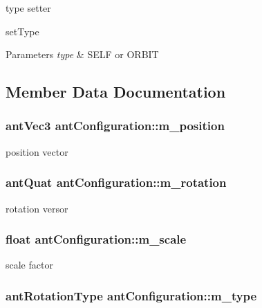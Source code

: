 type setter 

set\+Type 
\begin{DoxyParams}{Parameters}
{\em type} & S\+E\+L\+F or O\+R\+B\+I\+T \\
\hline
\end{DoxyParams}


\subsection{Member Data Documentation}
\hypertarget{classant_configuration_ab9fd2e843700f3589988064a9a2b494d}{
\subsubsection[{m\+\_\+position}]{\setlength{\rightskip}{0pt plus 5cm}ant\+Vec3 ant\+Configuration\+::m\+\_\+position\hspace{0.3cm}{\ttfamily [private]}}}\label{classant_configuration_ab9fd2e843700f3589988064a9a2b494d}
position vector \hypertarget{classant_configuration_a2cd9ee51364f0481040a6c9c1faf42ac}{
\subsubsection[{m\+\_\+rotation}]{\setlength{\rightskip}{0pt plus 5cm}ant\+Quat ant\+Configuration\+::m\+\_\+rotation\hspace{0.3cm}{\ttfamily [private]}}}\label{classant_configuration_a2cd9ee51364f0481040a6c9c1faf42ac}
rotation versor \hypertarget{classant_configuration_ae1addd09ae683a014f37492aab019926}{
\subsubsection[{m\+\_\+scale}]{\setlength{\rightskip}{0pt plus 5cm}float ant\+Configuration\+::m\+\_\+scale\hspace{0.3cm}{\ttfamily [private]}}}\label{classant_configuration_ae1addd09ae683a014f37492aab019926}
scale factor \hypertarget{classant_configuration_a9c6602c2995ea38583650da13b36b015}{
\subsubsection[{m\+\_\+type}]{\setlength{\rightskip}{0pt plus 5cm}ant\+Rotation\+Type ant\+Configuration\+::m\+\_\+type\hspace{0.3cm}{\ttfamily [private]}}}\label{classant_configuration_a9c6602c2995ea38583650da13b36b015}
